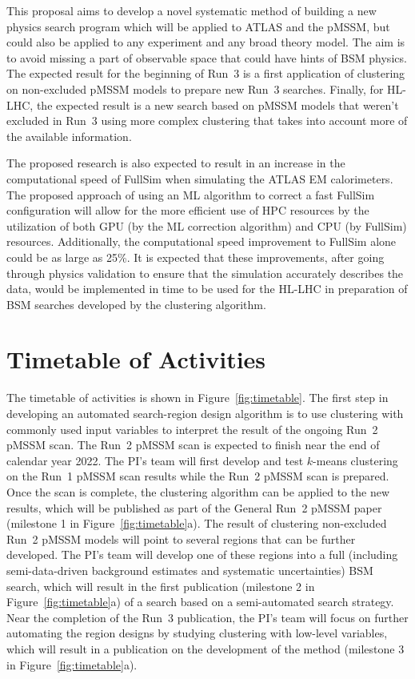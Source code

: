 \documentclass[letter, USenglish, 11pt, subfigure]{article}
\begin{document}
This proposal aims to develop a novel systematic method of building a new physics search program which will be applied to ATLAS and the pMSSM, but could also be applied to any experiment and any broad theory model. The aim is to avoid missing a part of observable space that could have hints of BSM physics. The expected result for the beginning of Run~3 is a first application of clustering on non-excluded pMSSM models to prepare new Run~3 searches. Finally, for HL-LHC, the expected result is a new search based on pMSSM models that weren't excluded in Run~3 using more complex clustering that takes into account more of the available information. 

The proposed research is also expected to result in an increase in the computational speed of FullSim when simulating the ATLAS EM calorimeters. The proposed approach of using an ML algorithm to correct a fast FullSim configuration will allow for the more efficient use of HPC resources by the utilization of both GPU (by the ML correction algorithm) and CPU (by FullSim) resources. Additionally, the computational speed improvement to FullSim alone could be as large as 25\%. It is expected that these improvements, after going through physics validation to ensure that the simulation accurately describes the data, would be implemented in time to be used for the HL-LHC in preparation of BSM searches developed by the clustering algorithm.

\section{Timetable of Activities}

The timetable of activities is shown in Figure~\ref{fig:timetable}. The first step in developing an automated search-region design algorithm is to use clustering with commonly used input variables to interpret the result of the ongoing Run~2 pMSSM scan. The Run~2 pMSSM scan is expected to finish near the end of calendar year 2022. The PI's team will first develop and test $k$-means clustering on the Run~1 pMSSM scan results while the Run~2 pMSSM scan is prepared. Once the scan is complete, the clustering algorithm can be applied to the new results, which will be published as part of the General Run~2 pMSSM paper (milestone 1 in Figure~\ref{fig:timetable}a). The result of clustering non-excluded Run~2 pMSSM models will point to several regions that can be further developed. The PI's team will develop one of these regions into a full (including semi-data-driven background estimates and systematic uncertainties) BSM search, which will result in the first publication (milestone 2 in Figure~\ref{fig:timetable}a) of a search based on a semi-automated search strategy. Near the completion of the Run~3 publication, the PI's team will focus on further automating the region designs by studying clustering with low-level variables, which will result in a publication on the development of the method (milestone 3 in Figure~\ref{fig:timetable}a).
\end{document}
